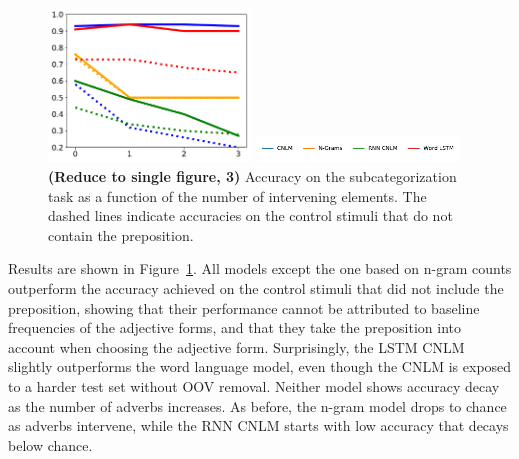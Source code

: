 \begin{figure}
\includegraphics[width=0.48\textwidth]{figures/german-prep-with-control.pdf}

\includegraphics[width=0.48\textwidth]{figures/german-legend.pdf}
\caption{\textbf{(Reduce to single figure, 3)} Accuracy on the subcategorization task as a function of the number of intervening elements. The dashed lines indicate accuracies on the control stimuli that do not contain the preposition.}\label{fig:prep}
\end{figure}

Results are shown in Figure~\ref{fig:prep}. All models except the one
based on n-gram counts outperform the accuracy achieved on the control
stimuli that did not include the preposition, showing that their
performance cannot be attributed to baseline frequencies of the
adjective forms, and that they take the preposition into account when
choosing the adjective form.  Surprisingly, the LSTM CNLM slightly
outperforms the word language model, even though the CNLM is exposed
to a harder test set without OOV removal.  Neither model shows
accuracy decay as the number of adverbs increases.  As before, the
n-gram model drops to chance as adverbs intervene, while the RNN CNLM
starts with low accuracy that decays below chance.


